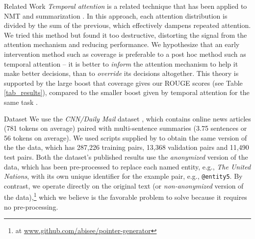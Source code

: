 \documentclass[11pt,a4paper]{article}
\begin{document}
\begin{section}{Related Work}
\textit{Temporal attention} is a related technique that has been applied to NMT \cite{sankaran2016temporal}  and summarization \cite{nallapati2016abstractive}.
In this approach, each attention distribution is divided by the sum of the previous, which effectively dampens repeated attention.
We tried this method but found it too destructive, distorting the signal from the attention mechanism and reducing performance.
We hypothesize that an early intervention method such as coverage is preferable to a post hoc method such as temporal attention -- it is better to \textit{inform} the attention mechanism to help it make better decisions, than to \textit{override} its decisions altogether.
This theory is supported by the large boost that coverage gives our ROUGE scores (see Table \ref{tab_results}), compared to the smaller boost given by temporal attention for the same task \cite{nallapati2016abstractive}.

\end{section} 

\begin{section}{Dataset}
\label{sec_dataset}
We use the \textit{CNN\slash Daily Mail} dataset \cite{hermann2015teaching,nallapati2016abstractive}, which contains online news articles (781 tokens on average) paired with multi-sentence summaries (3.75 sentences or 56 tokens on average).
We used scripts supplied by \citet{nallapati2016abstractive} to obtain the same version of the the data, which has 287,226 training pairs, 13,368 validation pairs and 11,490 test pairs.
Both the dataset's published results \cite{nallapati2016abstractive, nallapati2016summarunner} use the \textit{anonymized} version of the data, which has been pre-processed to replace each named entity, e.g., \textit{The United Nations}, with its own unique identifier for the example pair, e.g., \texttt{@entity5}.
By contrast, we operate directly on the original text (or \textit{non-anonymized} version of the data),\footnote{at \url{www.github.com/abisee/pointer-generator}} which we believe is the favorable problem to solve because it requires no pre-processing.
\end{section}
\end{document}
